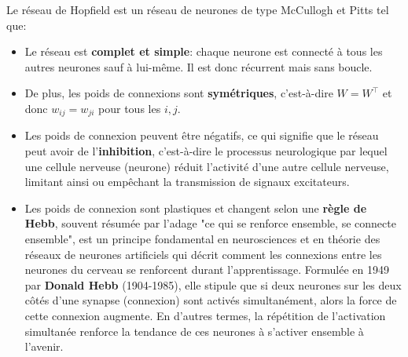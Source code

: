 \documentclass[12pt, letterpaper]{article}
\numberwithin{table}{section}
\numberwithin{figure}{section}
\numberwithin{equation}{section}
\begin{document}
\noindent Le réseau de Hopfield est un réseau de neurones de type McCullogh et Pitts tel que:
\begin{itemize}[label=\textbullet]
    \item Le réseau est \textbf{complet et simple}: chaque neurone est connecté à tous les autres neurones sauf à
    lui-même. Il est donc récurrent mais sans boucle.
    \item De plus, les poids de connexions sont \textbf{symétriques}, c'est-à-dire $W=W^\top$ et donc $w_{ij}=w_{ji}$
    pour tous les $i,j$.
    \item Les poids de connexion peuvent être négatifs, ce qui signifie que le réseau peut avoir de
    l'\textbf{inhibition}, c'est-à-dire le processus neurologique par lequel une cellule nerveuse (neurone)
    réduit l'activité d'une autre cellule nerveuse, limitant ainsi ou empêchant la transmission de signaux excitateurs.
    \item Les poids de connexion sont plastiques et changent selon une \textbf{règle de Hebb}, souvent résumée
    par l'adage "ce qui se renforce ensemble, se connecte ensemble", est un principe fondamental en neurosciences
    et en théorie des réseaux de neurones artificiels qui décrit comment les connexions entre les neurones du
    cerveau se renforcent durant l'apprentissage.
    Formulée en 1949 par \textbf{Donald Hebb} (1904-1985), elle stipule que si deux neurones sur les deux
    côtés d'une synapse (connexion) sont activés simultanément, alors la force de cette connexion augmente.
    En d'autres termes, la répétition de l'activation simultanée renforce la tendance de ces neurones à
    s'activer ensemble à l'avenir.
\end{itemize}
\end{document}
